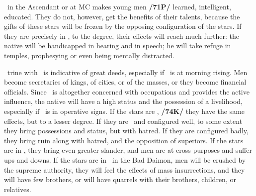 \Mercury\, in the Ascendant or at MC makes young men \textbf{/71P/} learned, intelligent, educated. They do
not, however, get the benefits of their talents, because the gifts of these stars will be frozen by the opposing configuration of the stars. If they are precisely in \Opposition, to the \mned degree, their effects will reach much further: the native will be handicapped in hearing and in speech; he will take refuge in temples, prophesying
or even being mentally distracted.

\Mercury\, \marginnote{\Mercury \Trine \Jupiter} trine with \Jupiter\, is indicative of great deeds, especially if \Mercury\, is at morning rising. Men become secretaries of kings, of cities, or of the masses, or they become financial officials. Since \Mercury\, is
altogether concerned with occupations and provides the active influence, the native will have a high status and the possession of a livelihood, especially if \Mercury\, is in operative signs. If the stars are \Sextile, \textbf{/74K/}
they have the same effects, but to a lesser degree. If they are \Square\, and configured well, to some extent
they bring possessions and status, but with hatred. If they are configured badly, they bring ruin along with hatred, and the opposition of superiors. If the stars are in \Opposition, they bring even greater slander, and men are at cross purposes and suffer ups and downs. If the stars are in \Opposition\, in the Bad Daimon, men will be crushed by the supreme authority, they will feel the effects of mass insurrections, and they will have few brothers, or will have quarrels with their brothers, children, or relatives.

